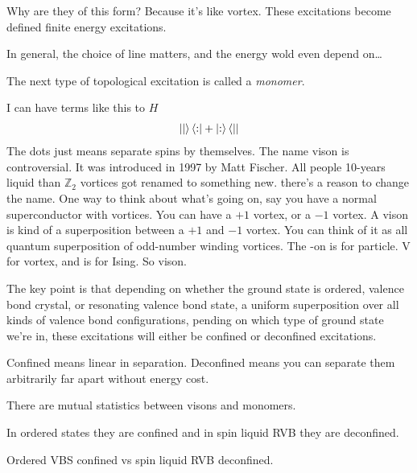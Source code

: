 Why are they of this form?
Because it's like vortex.
These excitations become defined finite energy excitations.

In general,
the choice of line matters,
and the energy wold even depend on\ldots

The next type of topological excitation is called a \emph{monomer}.

I can have terms like this to $H$
\begin{align}
    \ket{|}\bra{:} + \ket{:} \bra|{}
\end{align}
The dots just means separate spins by themselves.
The name vison is controversial.
It was introduced in 1997 by Matt Fischer.
All people 10-years liquid than $\mathbb{Z}_2$ vortices got renamed to something
new.
there's a reason to change the name.
One way to think about what's going on,
say you have a normal superconductor with vortices.
You can have a $+1$ vortex,
or a $-1$ vortex.
A vison is kind of a superposition between a $+1$ and $-1$ vortex.
You can think of it as all quantum superposition of odd-number winding
vortices.
The -on is for particle.
V for vortex, and is for Ising.
So vison.

The key point is that depending on whether the ground state is ordered,
valence bond crystal,
or resonating valence bond state,
a uniform superposition over all kinds of valence bond configurations,
pending on which type of ground state we're in,
these excitations will either be confined or deconfined excitations.

Confined means linear in separation.
Deconfined means you can separate them arbitrarily far apart without energy cost.

There are mutual statistics between visons and monomers.

In ordered states they are confined and in spin liquid RVB they are deconfined.

Ordered VBS confined vs spin liquid RVB deconfined.
